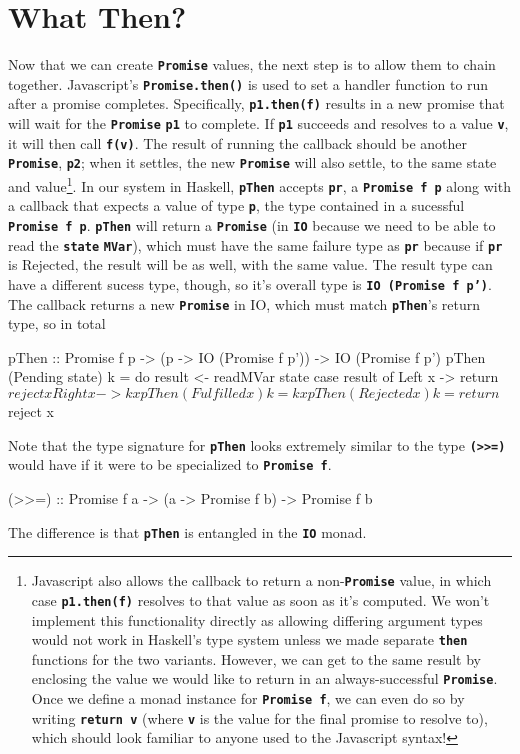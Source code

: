 \documentclass[12pt, english, letterpaper]{kuthesis}
\newcommand{\lit}[1]{\textbf{\texttt{#1}}}
\begin{document}
\section*{What Then?}
Now that we can create \lit{Promise} values, the next step is to allow them to chain together.  Javascript's \lit{Promise.then()} is used to set a handler function to run after a promise completes.  Specifically, \lit{p1.then(f)} results in a new promise that will wait for the \lit{Promise} \lit{p1} to complete.  If \lit{p1} succeeds and resolves to a value \lit v, it will then call \lit{f(v)}.  The result of running the callback should be another \lit{Promise}, \lit{p2}; when it settles, the new \lit{Promise} will also settle, to the same state and value\footnote{Javascript also allows the callback to return a non-\lit{Promise} value, in which case \lit{p1.then(f)} resolves to that value as soon as it's computed.  We won't implement this functionality directly
as allowing differing argument types would not work in Haskell's type system unless we made separate \lit{then} functions for the two variants.  However, we can get to the same result by enclosing the value we would like to return in an always-successful \lit{Promise}.  Once we define a monad instance for \lit{Promise f}, we can even do so by writing \lit{return v} (where \lit{v} is the value for the final promise to resolve to), which should look familiar to anyone used to the Javascript syntax!}.
In our system in Haskell, \lit{pThen} accepts \lit{pr}, a \lit{Promise f p} along with a callback that expects a value of type \lit p, the type contained in a sucessful \lit{Promise f p}.  \lit{pThen} will return a \lit{Promise} (in \lit{IO} because we need to be able to read the \lit{state} \lit{MVar}), which must have the same failure type as \lit{pr} because if \lit{pr} is Rejected, the result will be as well, with the same value.  The result type can have a different sucess type, though, so it's overall type is \lit{IO (Promise f p')}.  The callback returns a new \lit{Promise} in IO, which must match \lit{pThen}'s return type, so in total
\begin{code}
pThen :: Promise f p
        -> (p -> IO (Promise f p'))
        -> IO (Promise f p')
pThen (Pending state) k = do
  result <- readMVar state
  case result of
    Left x -> return $ reject x
    Right x -> k x
pThen (Fulfilled x) k = k x
pThen (Rejected x) k = return $ reject x
\end{code}
      
Note that the type signature for \lit{pThen} looks extremely similar to the type \lit{(>>=)} would have if it were to be specialized to \lit{Promise f}.
\begin{code}
(>>=) :: Promise f a -> (a -> Promise f b) -> Promise f b
\end{code}
The difference is that \lit{pThen} is entangled in the \lit{IO} monad.
\end{document}
